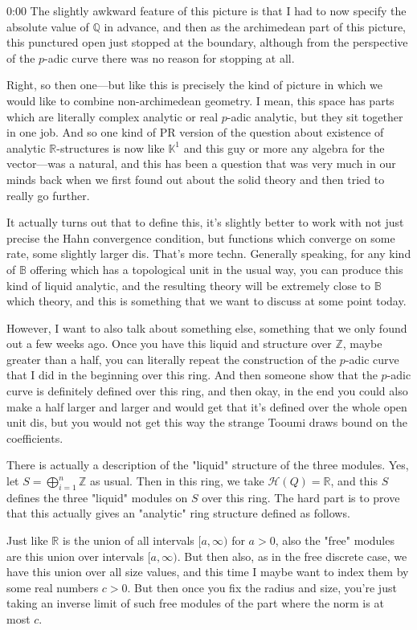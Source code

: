 \begin{unfinished}{0:00}
The slightly awkward feature of this picture is that I had to now specify the absolute value of $\mathbb{Q}$ in advance, and then as the archimedean part of this picture, this punctured open just stopped at the boundary, although from the perspective of the $p$-adic curve there was no reason for stopping at all.

Right, so then one---but like this is precisely the kind of picture in which we would like to combine non-archimedean geometry. I mean, this space has parts which are literally complex analytic or real $p$-adic analytic, but they sit together in one job. And so one kind of PR version of the question about existence of analytic $\mathbb{R}$-structures is now like $\mathbb{K}^1$ and this guy or more any algebra for the vector---was a natural, and this has been a question that was very much in our minds back when we first found out about the solid theory and then tried to really go further.

It actually turns out that to define this, it's slightly better to work with not just precise the Hahn convergence condition, but functions which converge on some rate, some slightly larger dis. That's more techn. Generally speaking, for any kind of $\mathbb{B}$ offering which has a topological unit in the usual way, you can produce this kind of liquid analytic, and the resulting theory will be extremely close to $\mathbb{B}$ which theory, and this is something that we want to discuss at some point today.

However, I want to also talk about something else, something that we only found out a few weeks ago. Once you have this liquid and structure over $\mathbb{Z}$, maybe greater than a half, you can literally repeat the construction of the $p$-adic curve that I did in the beginning over this ring. And then someone show that the $p$-adic curve is definitely defined over this ring, and then okay, in the end you could also make a half larger and larger and would get that it's defined over the whole open unit dis, but you would not get this way the strange Tooumi draws bound on the coefficients.

There is actually a description of the "liquid" structure of the three modules. Yes, let $S = \bigoplus_{i=1}^n \mathbb{Z}$ as usual. Then in this ring, we take $\mathcal{H}(Q) = \mathbb{R}$, and this $S$ defines the three "liquid" modules on $S$ over this ring. The hard part is to prove that this actually gives an "analytic" ring structure defined as follows.

Just like $\mathbb{R}$ is the union of all intervals $[a,\infty)$ for $a > 0$, also the "free" modules are this union over intervals $[a,\infty)$. But then also, as in the free discrete case, we have this union over all size values, and this time I maybe want to index them by some real numbers $c > 0$. But then once you fix the radius and size, you're just taking an inverse limit of such free modules of the part where the norm is at most $c$. 


\end{unfinished}
